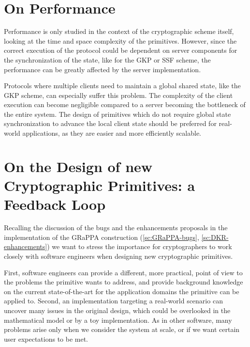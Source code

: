 \section{On Performance}\label{sc:gap-performance}

Performance is only studied in the context of the
cryptographic scheme itself, looking at the time and
space complexity of the primitives.
However, since the correct execution of the protocol
could be dependent on server components for the synchronization
of the state, like for the GKP or SSF scheme, the performance
can be greatly affected by the server implementation.

Protocols where multiple clients need to maintain
a global shared state, like the GKP scheme, can especially
suffer this problem. The complexity of the client
execution can become negligible compared to a server
becoming the bottleneck of the entire system.
The design of primitives which do not require 
global state synchronization to advance the local
client state should be preferred
for real-world applications, as they are easier 
and more efficiently scalable.



\section{On the Design of new Cryptographic Primitives: a Feedback Loop}\label{sc:collaboration-crypto-se}

Recalling the discussion of the bugs and the enhancements 
proposals in the implementation of the GRaPPA construction
(\cref{sc:GRaPPA-bugs}, \cref{sc:DKR-enhancements})
we want to stress the importance for
cryptographers to work closely with software engineers
when designing new cryptographic primitives.

First, software engineers can provide a different, more
practical, point of view to the problems the primitive
wants to address, and provide background knowledge
on the current state-of-the-art for the application
domains the primitive can be applied to.
Second, an implementation targeting a real-world scenario
can uncover many issues in the original design, which could be
overlooked in the mathematical model or by a toy implementation.
As in other software, many problems arise only when
we consider the system at scale, or if we want certain
user expectations to be met.


